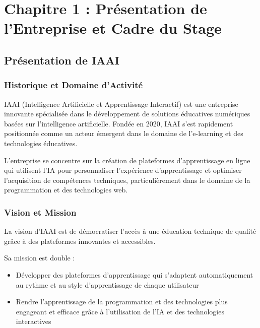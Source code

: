 \chapter*{Chapitre 1 : Présentation de l'Entreprise et Cadre du Stage}
\thispagestyle{fancy}
\setcounter{section}{0}
\newpage

\section{Présentation de IAAI}

\subsection{Historique et Domaine d'Activité}
IAAI (Intelligence Artificielle et Apprentissage Interactif) est une entreprise innovante spécialisée dans le développement de solutions éducatives numériques basées sur l'intelligence artificielle. Fondée en 2020, IAAI s'est rapidement positionnée comme un acteur émergent dans le domaine de l'e-learning et des technologies éducatives.

L'entreprise se concentre sur la création de plateformes d'apprentissage en ligne qui utilisent l'IA pour personnaliser l'expérience d'apprentissage et optimiser l'acquisition de compétences techniques, particulièrement dans le domaine de la programmation et des technologies web.

\subsection{Vision et Mission}
La vision d'IAAI est de démocratiser l'accès à une éducation technique de qualité grâce à des plateformes innovantes et accessibles. 

Sa mission est double :
\begin{itemize}
  \item Développer des plateformes d'apprentissage qui s'adaptent automatiquement au rythme et au style d'apprentissage de chaque utilisateur
  \item Rendre l'apprentissage de la programmation et des technologies plus engageant et efficace grâce à l'utilisation de l'IA et des technologies interactives
\end{itemize}


